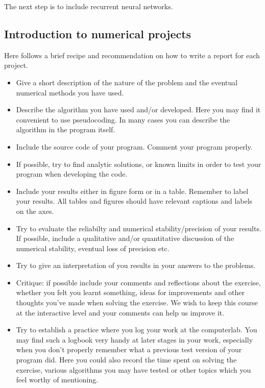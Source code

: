 \documentclass[%
oneside,                 %
final,                   %
10pt]{article}
\begin{document}
The next step is to include recurrent neural networks. 

\subsection*{Introduction to numerical projects}

Here follows a brief recipe and recommendation on how to write a report for each
project.

\begin{itemize}
  \item Give a short description of the nature of the problem and the eventual  numerical methods you have used.

  \item Describe the algorithm you have used and/or developed. Here you may find it convenient to use pseudocoding. In many cases you can describe the algorithm in the program itself.

  \item Include the source code of your program. Comment your program properly.

  \item If possible, try to find analytic solutions, or known limits in order to test your program when developing the code.

  \item Include your results either in figure form or in a table. Remember to        label your results. All tables and figures should have relevant captions        and labels on the axes.

  \item Try to evaluate the reliabilty and numerical stability/precision of your results. If possible, include a qualitative and/or quantitative discussion of the numerical stability, eventual loss of precision etc.

  \item Try to give an interpretation of you results in your answers to  the problems.

  \item Critique: if possible include your comments and reflections about the  exercise, whether you felt you learnt something, ideas for improvements and  other thoughts you've made when solving the exercise. We wish to keep this course at the interactive level and your comments can help us improve it.

  \item Try to establish a practice where you log your work at the  computerlab. You may find such a logbook very handy at later stages in your work, especially when you don't properly remember  what a previous test version  of your program did. Here you could also record  the time spent on solving the exercise, various algorithms you may have tested or other topics which you feel worthy of mentioning.
\end{itemize}
\end{document}

